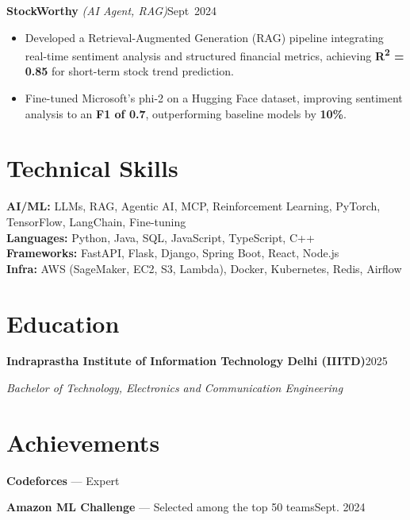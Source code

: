 \documentclass[10pt,letterpaper]{article}
\newcommand{\resumeHeading}[4]{%
  \par\noindent\textbf{#1}\hfill\mbox{#2}\par
  \noindent\textit{#3}\hfill\mbox{\textit{#4}}\par
}
\newcommand{\projectHeading}[3]{%
  \par\noindent\textbf{#1} \textit{(#2)}\hfill\mbox{#3}\par
}
\begin{document}
\projectHeading{StockWorthy}{AI Agent, RAG}{Sept 2024}
\begin{itemize}
\item Developed a Retrieval-Augmented Generation (RAG) pipeline integrating real-time sentiment analysis and structured financial metrics, achieving \textbf{R\textsuperscript{2} = 0.85} for short-term stock trend prediction.
\item Fine-tuned Microsoft's phi-2 on a Hugging Face dataset, improving sentiment analysis to an \textbf{F1 of 0.7}, outperforming baseline models by \textbf{10\%}.
\end{itemize}

\section{Technical Skills}
\textbf{AI/ML:} LLMs, RAG, Agentic AI, MCP, Reinforcement Learning, PyTorch, TensorFlow, LangChain, Fine-tuning \\[-1pt]
\textbf{Languages:} Python, Java, SQL, JavaScript, TypeScript, C++ \\[-1pt]
\textbf{Frameworks:} FastAPI, Flask, Django, Spring Boot, React, Node.js \\[-1pt]
\textbf{Infra:} AWS (SageMaker, EC2, S3, Lambda), Docker, Kubernetes, Redis, Airflow \\[-1pt]

\section{Education}
\resumeHeading
  {Indraprastha Institute of Information Technology Delhi (IIITD)}
  {2025}
  {Bachelor of Technology, Electronics and Communication Engineering}
  {}

\section{Achievements}
\textbf{Codeforces} --- Expert \par
\textbf{Amazon ML Challenge} --- Selected among the top 50 teams\hfill Sept. 2024\par
\end{document}
